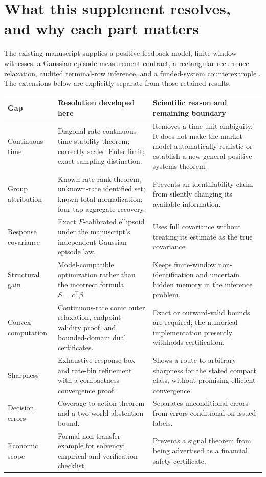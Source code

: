 \documentclass[11pt,a4paper]{article}
\theoremstyle{definition}\newtheorem{definition}[theorem]{Definition}
\theoremstyle{remark}\newtheorem{remark}[theorem]{Remark}
\begin{document}
\section{What this supplement resolves, and why each part matters}
The existing manuscript supplies a positive-feedback model, finite-window witnesses, a Gaussian episode measurement contract, a rectangular recurrence relaxation, audited terminal-row inference, and a funded-system counterexample \cite{mm}. The extensions below are explicitly separate from those retained results.

\begin{longtable}{P{.18\textwidth}P{.36\textwidth}P{.38\textwidth}}
\toprule
Gap & Resolution developed here & Scientific reason and remaining boundary\\\midrule
Continuous time & Diagonal-rate continuous-time stability theorem; correctly scaled Euler limit; exact-sampling distinction. & Removes a time-unit ambiguity. It does not make the market model automatically realistic or establish a new general positive-systems theorem.\\
Group attribution & Known-rate rank theorem; unknown-rate identified set; known-total normalization; four-tap aggregate recovery. & Prevents an identifiability claim from silently changing its available information.\\
Response covariance & Exact $F$-calibrated ellipsoid under the manuscript's independent Gaussian episode law. & Uses full covariance without treating its estimate as the true covariance.\\
Structural gain & Model-compatible optimization rather than the incorrect formula $S=c^\top\beta$. & Keeps finite-window non-identification and uncertain hidden memory in the inference problem.\\
Convex computation & Continuous-rate conic outer relaxation, endpoint-validity proof, and bounded-domain dual certificates. & Exact or outward-valid bounds are required; the numerical implementation presently withholds certification.\\
Sharpness & Exhaustive response-box and rate-bin refinement with a compactness convergence proof. & Shows a route to arbitrary sharpness for the stated compact class, without promising efficient convergence.\\
Decision errors & Coverage-to-action theorem and a two-world abstention bound. & Separates unconditional errors from errors conditional on issued labels.\\
Economic scope & Formal non-transfer example for solvency; empirical and verification checklist. & Prevents a signal theorem from being advertised as a financial safety certificate.\\\bottomrule
\end{longtable}
\end{document}
